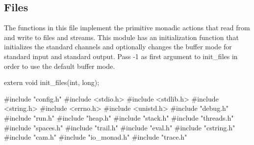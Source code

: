 %
%
\subsection{Files}
The functions in this file implement the primitive monadic actions
that read from and write to files and streams. This module has an
initialization function that initializes the standard channels and
optionally changes the buffer mode for standard input and standard
output. Pass {\Tt{}-1\nwendquote} as first argument to {\Tt{}init{\_}files\nwendquote} in order to
use the default buffer mode.

\nwenddocs{}\endmoddef\nwstartdeflinemarkup\nwenddeflinemarkup
extern void init_files(int, long);

\nwendcode{}\nwdocspar
\nwenddocs{}\endmoddef\nwstartdeflinemarkup{}\nwenddeflinemarkup
#include "config.h"
#include <stdio.h>
#include <stdlib.h>
#include <string.h>
#include <errno.h>
#include <unistd.h>
#include "debug.h"
#include "run.h"
#include "heap.h"
#include "stack.h"
#include "threads.h"
#include "spaces.h"
#include "trail.h"
#include "eval.h"
#include "cstring.h"
#include "cam.h"
#include "io_monad.h"
#include "trace.h"

